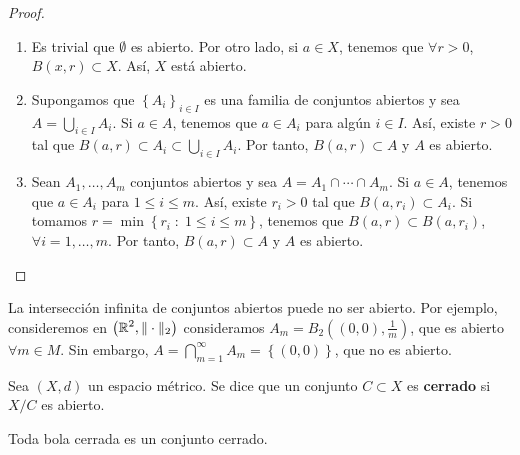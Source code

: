 \begin{proof}
\begin{enumerate}
\item Es trivial que $\displaystyle \emptyset $ es abierto. Por otro lado, si $\displaystyle a \in X $, tenemos que $\displaystyle \forall r > 0 $, $\displaystyle B\left(x,r\right) \subset X $. Así, $\displaystyle X $ está abierto.
\item Supongamos que $\displaystyle \left\{ A_{i}\right\}_{i \in I} $ es una familia de conjuntos abiertos y sea $\displaystyle A = \bigcup_{i \in I}A_{i} $. Si $\displaystyle a \in A $, tenemos que $\displaystyle a \in A_{i} $ para algún $\displaystyle i \in I $. Así, existe $\displaystyle r>0 $ tal que $\displaystyle B \left(a,r\right) \subset A_{i} \subset \bigcup_{i \in I}A_{i}$. Por tanto, $\displaystyle B\left(a,r\right) \subset A $ y $\displaystyle A $ es abierto.
\item Sean $\displaystyle A_{1}, \ldots, A_{m} $ conjuntos abiertos y sea $\displaystyle A = A_{1} \cap \cdots \cap A_{m} $. Si $\displaystyle a \in A $, tenemos que $\displaystyle a \in A_{i} $ para $\displaystyle 1 \leq i \leq m $.
	Así, existe $\displaystyle r_{i} > 0 $ tal que $\displaystyle B\left(a, r_{i}\right) \subset A_{i} $. Si tomamos $\displaystyle r = \min \left\{ r_{i} \; : \; 1 \leq i \leq m\right\}  $, tenemos que $\displaystyle B\left(a, r\right) \subset B\left(a, r_{i}\right) $, $\displaystyle \forall i = 1, \ldots, m $. Por tanto, $\displaystyle B\left(a,r\right) \subset A $ y $\displaystyle A $ es abierto.
\end{enumerate}
\end{proof}
\begin{observation}
La intersección infinita de conjuntos abiertos puede no ser abierto. Por ejemplo, consideremos en $\displaystyle \left(\mathbb{R}^{2}, \| \cdot \|_{2}\right) $ consideramos $\displaystyle A_{m} = B_{2}\left(\left(0,0\right), \frac{1}{m}\right) $, que es abierto $\displaystyle \forall m \in M $.
Sin embargo, $\displaystyle A = \bigcap_{m = 1}^{\infty}A_{m} = \left\{ \left(0,0\right)\right\}  $, que no es abierto.
\end{observation}
\begin{definition}
Sea $\displaystyle \left(X,d\right) $ un espacio métrico. Se dice que un conjunto $\displaystyle C \subset X $ es \textbf{cerrado} si $\displaystyle X/C $ es abierto.
\end{definition}
\begin{prop}
Toda bola cerrada es un conjunto cerrado.
\end{prop}
